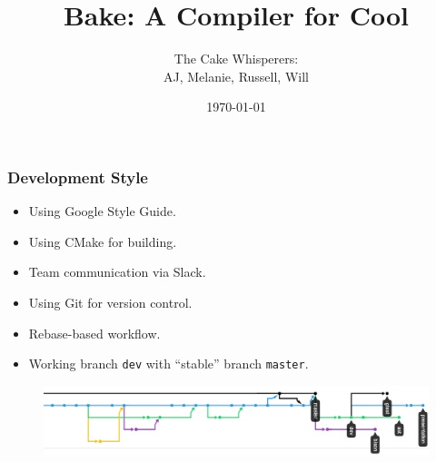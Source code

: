 \documentclass{beamer}
\title[Cool Baking]{Bake: A Compiler for Cool}
\author{The Cake Whisperers: \\AJ, Melanie, Russell, Will}
\date{\today}
\begin{document}
\frame{\titlepage}

\begin{frame}
  \frametitle{Development Style}

  \begin{itemize}
    \item Using Google Style Guide.
    \item Using CMake for building\footnotemark.
    \item Team communication via Slack.
    \item Using Git for version control.
    \item Rebase-based workflow.
    \item Working branch \texttt{dev} with ``stable'' branch \texttt{master}.
  \end{itemize}

  \begin{figure}
    \centering
    \includegraphics[width=\linewidth]{img/network}
  \end{figure}

\end{frame}
\end{document}
